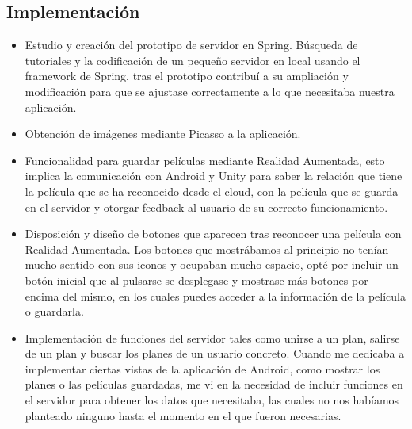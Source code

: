     \subsection{Implementación}
    \label{makereference7.1.3}
        \begin{itemize}
            \item Estudio y creación del prototipo de servidor en Spring. Búsqueda de tutoriales y la codificación de un pequeño servidor en local usando el framework de Spring, tras el prototipo contribuí a su ampliación y modificación para que se ajustase correctamente a lo que necesitaba nuestra aplicación.
            \item Obtención de imágenes mediante Picasso a la aplicación. 
            \item Funcionalidad para guardar películas mediante Realidad Aumentada, esto implica la comunicación con Android y Unity para saber la relación que tiene la película que se ha reconocido desde el cloud, con la película que se guarda en el servidor y otorgar feedback al usuario de su correcto funcionamiento.
            \item Disposición y diseño de botones que aparecen tras reconocer una
            película con Realidad Aumentada. Los botones que mostrábamos al principio no tenían mucho sentido con sus iconos y ocupaban mucho espacio, opté por incluir un botón inicial que al pulsarse se desplegase y mostrase más botones por encima del mismo, en los cuales puedes acceder a la información de la película o guardarla.
            \item Implementación de funciones del servidor tales como unirse a un plan, salirse de un plan y buscar los planes de un usuario concreto. Cuando me dedicaba a implementar ciertas vistas de la aplicación de Android, como mostrar los planes o las películas guardadas, me vi en la necesidad de incluir funciones en el servidor para obtener los datos que necesitaba, las cuales no nos habíamos planteado ninguno hasta el momento en el que fueron necesarias. 
        \end{itemize}
